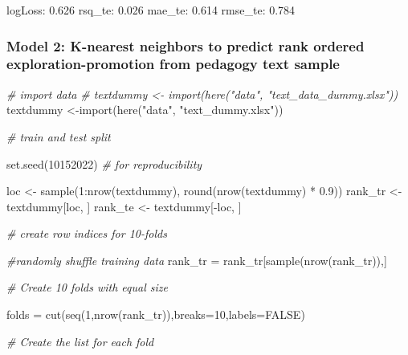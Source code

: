 \documentclass[
  english,
  man]{apa6}
\newenvironment{Shaded}{\begin{snugshade}}{\end{snugshade}}
\newcommand{\AttributeTok}[1]{\textcolor[rgb]{0.77,0.63,0.00}{#1}}
\newcommand{\CommentTok}[1]{\textcolor[rgb]{0.56,0.35,0.01}{\textit{#1}}}
\newcommand{\ConstantTok}[1]{\textcolor[rgb]{0.00,0.00,0.00}{#1}}
\newcommand{\DecValTok}[1]{\textcolor[rgb]{0.00,0.00,0.81}{#1}}
\newcommand{\FloatTok}[1]{\textcolor[rgb]{0.00,0.00,0.81}{#1}}
\newcommand{\FunctionTok}[1]{\textcolor[rgb]{0.00,0.00,0.00}{#1}}
\newcommand{\NormalTok}[1]{#1}
\newcommand{\OtherTok}[1]{\textcolor[rgb]{0.56,0.35,0.01}{#1}}
\newcommand{\SpecialCharTok}[1]{\textcolor[rgb]{0.00,0.00,0.00}{#1}}
\newcommand{\StringTok}[1]{\textcolor[rgb]{0.31,0.60,0.02}{#1}}
\begin{document}
logLoss: 0.626
rsq\_te: 0.026
mae\_te: 0.614
rmse\_te: 0.784

\hypertarget{model-2-k-nearest-neighbors-to-predict-rank-ordered-exploration-promotion-from-pedagogy-text-sample}{%
\subsubsection{Model 2: K-nearest neighbors to predict rank ordered exploration-promotion from pedagogy text sample}\label{model-2-k-nearest-neighbors-to-predict-rank-ordered-exploration-promotion-from-pedagogy-text-sample}}

\begin{Shaded}
\begin{Highlighting}[]
\CommentTok{\# import data}
\CommentTok{\# textdummy \textless{}{-} import(here("data", "text\_data\_dummy.xlsx"))}
\NormalTok{ textdummy }\OtherTok{\textless{}{-}}\FunctionTok{import}\NormalTok{(}\FunctionTok{here}\NormalTok{(}\StringTok{"data"}\NormalTok{, }\StringTok{"text\_dummy.xlsx"}\NormalTok{))}

\CommentTok{\# train and test split}

\FunctionTok{set.seed}\NormalTok{(}\DecValTok{10152022}\NormalTok{) }\CommentTok{\# for reproducibility}

\NormalTok{loc }\OtherTok{\textless{}{-}} \FunctionTok{sample}\NormalTok{(}\DecValTok{1}\SpecialCharTok{:}\FunctionTok{nrow}\NormalTok{(textdummy), }\FunctionTok{round}\NormalTok{(}\FunctionTok{nrow}\NormalTok{(textdummy) }\SpecialCharTok{*} \FloatTok{0.9}\NormalTok{))}
\NormalTok{rank\_tr }\OtherTok{\textless{}{-}}\NormalTok{ textdummy[loc, ]}
\NormalTok{rank\_te }\OtherTok{\textless{}{-}}\NormalTok{ textdummy[}\SpecialCharTok{{-}}\NormalTok{loc, ]}


\CommentTok{\# create row indices for 10{-}folds}

  \CommentTok{\#randomly shuffle training data}
\NormalTok{rank\_tr }\OtherTok{=}\NormalTok{ rank\_tr[}\FunctionTok{sample}\NormalTok{(}\FunctionTok{nrow}\NormalTok{(rank\_tr)),]}

    \CommentTok{\# Create 10 folds with equal size}

\NormalTok{      folds }\OtherTok{=} \FunctionTok{cut}\NormalTok{(}\FunctionTok{seq}\NormalTok{(}\DecValTok{1}\NormalTok{,}\FunctionTok{nrow}\NormalTok{(rank\_tr)),}\AttributeTok{breaks=}\DecValTok{10}\NormalTok{,}\AttributeTok{labels=}\ConstantTok{FALSE}\NormalTok{)}
  
    \CommentTok{\# Create the list for each fold }
      

\end{Highlighting}
\end{Shaded}
\end{document}
